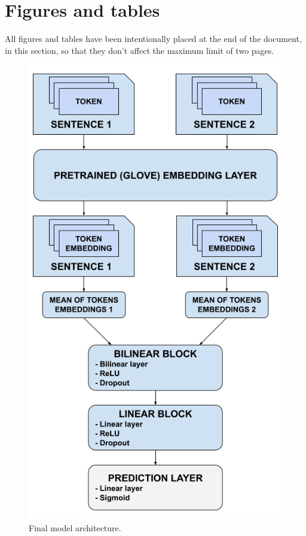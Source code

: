 \documentclass[11pt,a4paper]{article}
\begin{document}
	\section{Figures and tables}
	All figures and tables have been intentionally placed at the end of the document, in this section, so that they don't affect the maximum limit of two pages.
	\begin{figure}[H]
		\centering
		\includegraphics[width=1\columnwidth]{bilinear_model.png}
		\caption{Final model architecture.}
		\label{fig:architecture}
	\end{figure}
\end{document}
